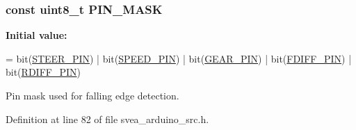 \subsubsection[{\texorpdfstring{P\+I\+N\+\_\+\+M\+A\+SK}{PIN_MASK}}]{\setlength{\rightskip}{0pt plus 5cm}const uint8\+\_\+t P\+I\+N\+\_\+\+M\+A\+SK}\hypertarget{group__PwmInputConstants_ga89098a2ff03e736c257b322e78e7c6e3}{}\label{group__PwmInputConstants_ga89098a2ff03e736c257b322e78e7c6e3}
{\bfseries Initial value\+:}
\begin{DoxyCode}
= bit(\hyperlink{group__RecieverPwmPins_ga2a0f80bf9db172cf17bb4b928e861c50}{STEER\_PIN}) 
                       | bit(\hyperlink{group__RecieverPwmPins_gafee863b6234dfd9b3a4d97265e4a9a8a}{SPEED\_PIN})
                       | bit(\hyperlink{group__RecieverPwmPins_gaa1ed2fccc158e7fcb5aab8eb00e39b72}{GEAR\_PIN})
                       | bit(\hyperlink{group__RecieverPwmPins_ga91432e122cb52e765d68aed43104e478}{FDIFF\_PIN})
                       | bit(\hyperlink{group__RecieverPwmPins_ga98a9ce3925b9f576ed03843a3c6c1623}{RDIFF\_PIN})
\end{DoxyCode}


Pin mask used for falling edge detection. 



Definition at line 82 of file svea\+\_\+arduino\+\_\+src.\+h.


